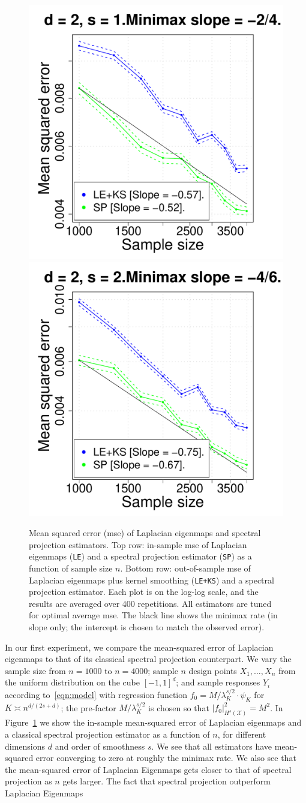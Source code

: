 \documentclass{article}
\newcommand{\1}{\mathbf{1}}
\newcommand{\mc}[1]{\mathcal{#1}}
\theoremstyle{alden}
\theoremstyle{aldenthm}
\theoremstyle{definition}
\theoremstyle{remark}
\begin{document}
\begin{figure}[tb]
	\includegraphics[width=.245\textwidth]{figures/out_of_sample_mse/mse_by_sample_size_2d_1s.pdf}
	\includegraphics[width=.245\textwidth]{figures/out_of_sample_mse/mse_by_sample_size_2d_2s.pdf}
	\caption{Mean squared error (mse) of Laplacian eigenmaps and spectral projection estimators. Top row: in-sample mse of Laplacian eigenmaps (\texttt{LE}) and a spectral projection estimator (\texttt{SP}) as a function of sample size $n$. Bottom row: out-of-sample mse of Laplacian eigenmaps plus kernel smoothing (\texttt{LE+KS}) and a spectral projection estimator. Each plot is on the log-log scale, and the results are averaged over 400 repetitions. All estimators are tuned for optimal average mse. The black line shows the minimax rate (in slope only; the intercept is chosen to match the observed error).}
	\label{fig:fig1}
\end{figure}

In our first experiment, we compare the mean-squared error of Laplacian eigenmaps to that of its classical spectral projection counterpart. We vary the sample size from $n = 1000$ to $n = 4000$; sample $n$ design points $X_1,\ldots,X_n$ from the uniform distribution on the cube $[-1,1]^d$; and sample responses $Y_i$ according to~\eqref{eqn:model} with regression function $f_0 = M/\lambda_K^{s/2} \cdot \psi_K$ for $K \asymp n^{d/(2s + d)}$; the pre-factor $M/\lambda_K^{s/2}$ is chosen so that $|f_0|_{H^s(\mc{X})}^2 = M^2$. In Figure~\ref{fig:fig1} we show the in-sample mean-squared error of Laplacian eigenmaps and a classical spectral projection estimator as a function of $n$, for different dimensions $d$ and order of smoothness $s$. We see that all estimators have mean-squared error converging to zero at roughly the minimax rate. We also see that the mean-squared error of Laplacian Eigenmaps gets closer to that of spectral projection as $n$ gets larger. The fact that spectral projection outperform Laplacian Eigenmaps 
\end{document}
